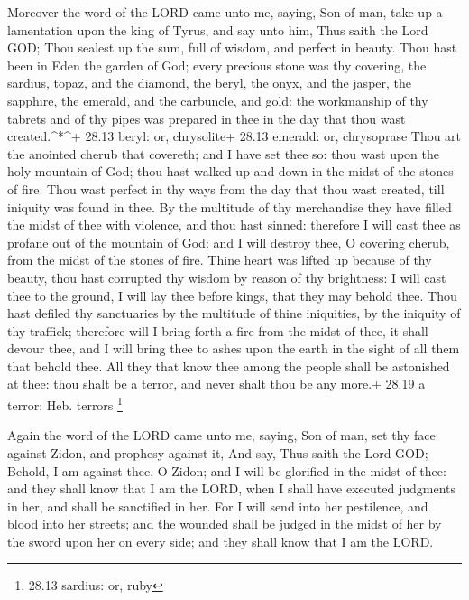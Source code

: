  Moreover the word of the LORD came unto me, saying,
 Son of man, take up a lamentation upon the king of Tyrus,
and say unto him, Thus saith the Lord GOD; Thou sealest up the sum, full
of wisdom, and perfect in beauty.  Thou hast been in Eden
the garden of God; every precious stone was thy covering, the sardius,
topaz, and the diamond, the beryl, the onyx, and the jasper, the
sapphire, the emerald, and the carbuncle, and gold: the workmanship of
thy tabrets and of thy pipes was prepared in thee in the day that thou
wast created.\^{}*\^{}+ 28.13 beryl: or, chrysolite+ 28.13 emerald: or,
chrysoprase  Thou art the anointed cherub that covereth;
and I have set thee so: thou wast upon the holy mountain of God; thou
hast walked up and down in the midst of the stones of fire.
 Thou wast perfect in thy ways from the day that thou wast
created, till iniquity was found in thee.  By the multitude
of thy merchandise they have filled the midst of thee with violence, and
thou hast sinned: therefore I will cast thee as profane out of the
mountain of God: and I will destroy thee, O covering cherub, from the
midst of the stones of fire.  Thine heart was lifted up
because of thy beauty, thou hast corrupted thy wisdom by reason of thy
brightness: I will cast thee to the ground, I will lay thee before
kings, that they may behold thee.  Thou hast defiled thy
sanctuaries by the multitude of thine iniquities, by the iniquity of thy
traffick; therefore will I bring forth a fire from the midst of thee, it
shall devour thee, and I will bring thee to ashes upon the earth in the
sight of all them that behold thee.  All they that know
thee among the people shall be astonished at thee: thou shalt be a
terror, and never shalt thou be any more.+ 28.19 a terror: Heb. terrors
\footnote{28.13 sardius: or, ruby}

 Again the word of the LORD came unto me, saying,
 Son of man, set thy face against Zidon, and prophesy
against it,  And say, Thus saith the Lord GOD; Behold, I am
against thee, O Zidon; and I will be glorified in the midst of thee: and
they shall know that I am the LORD, when I shall have executed judgments
in her, and shall be sanctified in her.  For I will send
into her pestilence, and blood into her streets; and the wounded shall
be judged in the midst of her by the sword upon her on every side; and
they shall know that I am the LORD.

